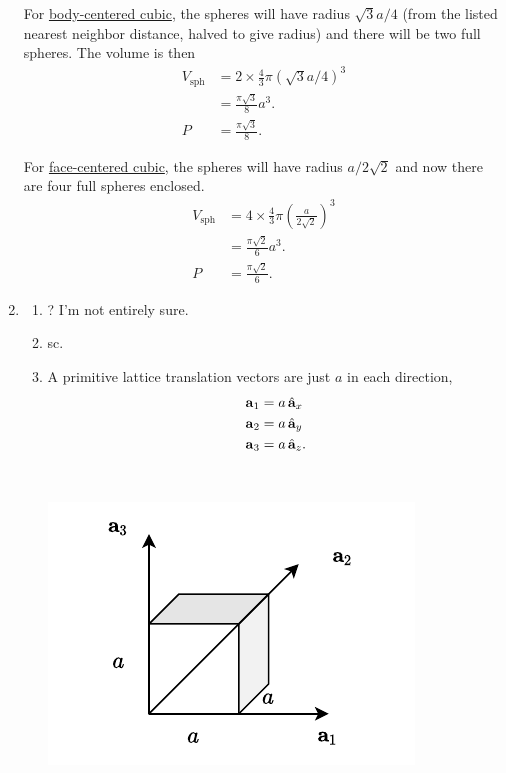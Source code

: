 \documentclass{homework}
\begin{document}
\begin{enumerate}
			For \underline{body-centered cubic}, the spheres will have radius $\sqrt{3}a/4$ (from the listed nearest neighbor distance, halved to give radius) and there will be two full spheres. The volume is then \begin{align*}
				V_\mathrm{sph} & = 2 \times \frac{4}{3} \pi \left(\sqrt{3}a/4\right)^3 \\
					& = \frac{\pi \sqrt{3}}{8} a^3. \\
				P & = \frac{\pi \sqrt{3}}{8}.
			\end{align*}
			
			For \underline{face-centered cubic}, the spheres will have radius $a/2\sqrt{2}$ and now there are four full spheres enclosed. \begin{align*}
				V_\mathrm{sph} & = 4 \times \frac{4}{3} \pi \left(\frac{a}{2\sqrt{2}}\right)^3 \\
					& = \frac{\pi \sqrt{2}}{6} a^3. \\
				P & = \frac{\pi \sqrt{2}}{6}.
			\end{align*}
		\item \begin{enumerate}
			\item {}? I'm not entirely sure.
			\item sc.
			\item \begin{minipage}[t]{0.6\textwidth}
				A primitive lattice translation vectors are just $a$ in each direction, \begin{align*}
					\boldsymbol{\mathrm{a}}_1 & = a \thinspace\hat{ \mathbf{a}}_{x} \\
					\boldsymbol{\mathrm{a}}_2 & = a \thinspace\hat{ \mathbf{a}}_{y} \\
					\boldsymbol{\mathrm{a}}_3 & = a \thinspace\hat{ \mathbf{a}}_{z}.
				\end{align*}
			\end{minipage}
			~ 
			\begin{minipage}[t]{0.4\textwidth}
					\vspace{0.1em}
					\begin{center}
						\includegraphics[width=0.9\linewidth]{primcell}
					\end{center}
			\end{minipage}
			

\end{enumerate}
\end{enumerate}
\end{document}
